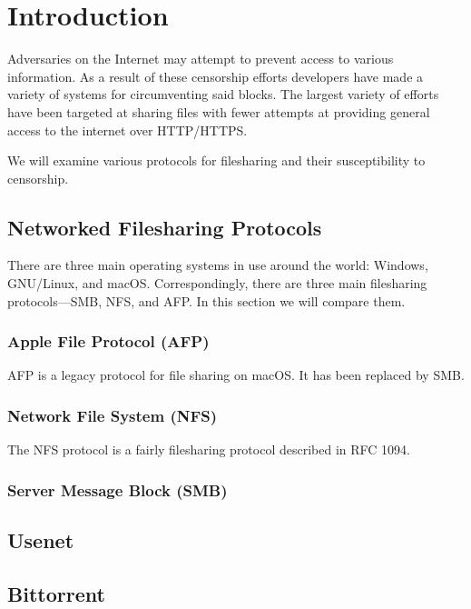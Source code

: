 \section{Introduction}\label{sec:intro}

Adversaries on the Internet may attempt to prevent access to various
information. As a result of these censorship efforts developers have made a
variety of systems for circumventing said blocks. The largest variety of efforts
have been targeted at sharing files with fewer attempts at providing general
access to the internet over HTTP/HTTPS.

We will examine various protocols for filesharing and their susceptibility to
censorship.

\subsection{Networked Filesharing Protocols}

There are three main operating systems in use around the world: Windows,
GNU/Linux, and macOS. Correspondingly, there are three main filesharing
protocols---SMB, NFS, and AFP. In this section we will compare them.

\subsubsection{Apple File Protocol (AFP)}

AFP is a legacy protocol for file sharing on macOS. It has been replaced by SMB.

\subsubsection{Network File System (NFS)}

The NFS protocol is a fairly filesharing protocol described in RFC
1094\cite{NFSNetworkFile1989}.


\subsubsection{Server Message Block (SMB)}


\subsection{Usenet}


\subsection{Bittorrent}

